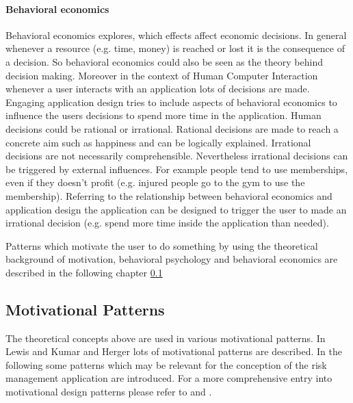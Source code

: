 \paragraph*{Behavioral economics}

Behavioral economics explores, which effects affect economic decisions. In general whenever a resource (e.g. time, money) is reached or lost it is the consequence of a decision. So behavioral economics could also be seen as the theory behind decision making. Moreover in the context of Human Computer Interaction whenever a user interacts with an application 
lots of decisions are made. Engaging application design tries to include aspects of behavioral economics to influence the users decisions to spend more time in the application. 
Human decisions could be rational or irrational. Rational decisions are made to reach a concrete aim such as happiness and can be logically explained. Irrational decisions are not necessarily comprehensible.  Nevertheless irrational decisions can be triggered by external influences. For example people tend to use memberships, even if they doesn't profit (e.g. injured people go to the gym to use the membership).
Referring to the relationship between behavioral economics and application design the application can be designed to trigger the user to made an irrational decision (e.g. spend more time inside the application than needed). \cite[p. 19]{lewisIrresistibleAppsMotivational2014}


Patterns which motivate the user to do something by using the theoretical background of motivation, behavioral psychology and behavioral economics are described in the following chapter \ref{sec:theoryBc}



\subsection{Motivational Patterns}
\label{sec:theoryBc}

The theoretical concepts above are used in various motivational patterns. In Lewis \cite{lewisIrresistibleAppsMotivational2014} and Kumar and Herger \cite{inproceedings} lots of motivational patterns are described. In the following some patterns which may be relevant for the conception of the risk management application are introduced. For a more comprehensive entry into motivational design patterns please refer to \cite{lewisIrresistibleAppsMotivational2014} and \cite{inproceedings}.

